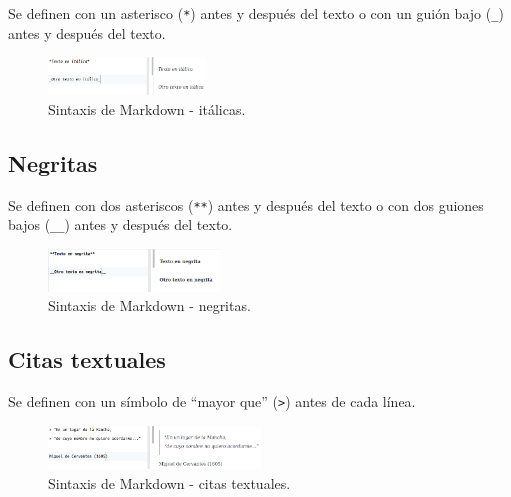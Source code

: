 \documentclass[
  letterpaper,
  DIV=11,
  numbers=noendperiod]{scrreprt}
\begin{document}
Se definen con un asterisco (\texttt{*}) antes y después del texto o con
un guión bajo (\texttt{\_}) antes y después del texto.

\begin{figure}

{\centering \includegraphics[width=1.66in,height=\textheight]{./img/md-italica.png}

}

\caption{\label{fig-md-italicas}Sintaxis de Markdown - itálicas.}

\end{figure}

\hypertarget{negritas}{%
\subsection{Negritas}\label{negritas}}

Se definen con dos asteriscos (\texttt{**}) antes y después del texto o
con dos guiones bajos (\texttt{\_\_}) antes y después del texto.

\begin{figure}

{\centering \includegraphics[width=1.78in,height=\textheight]{./img/md-negrita.png}

}

\caption{\label{fig-md-negritas}Sintaxis de Markdown - negritas.}

\end{figure}

\hypertarget{citas-textuales}{%
\subsection{Citas textuales}\label{citas-textuales}}

Se definen con un símbolo de ``mayor que'' (\texttt{\textgreater{}})
antes de cada línea.

\begin{figure}

{\centering \includegraphics[width=2.22in,height=\textheight]{./img/md-cita.png}

}

\caption{\label{fig-md-citas}Sintaxis de Markdown - citas textuales.}

\end{figure}
\end{document}
